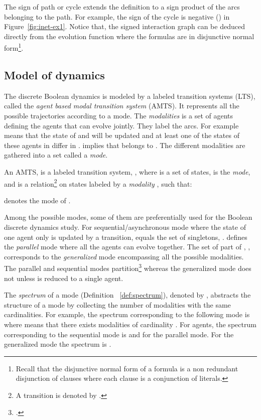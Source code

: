 \documentclass[12pt]{elsarticle}
\begin{document}
The sign of path or cycle extends the definition to a sign product of the arcs belonging to the path. For example, the sign of the cycle  is negative () in Figure~\ref{fig:inet-ex1}. Notice that, the signed interaction graph can be deduced directly from the evolution function where the formulas are in disjunctive normal form\footnote{Recall that the disjunctive normal form of a formula is a non redundant disjunction of clauses where each clause is a conjunction of literals.}. 



\subsection{Model of dynamics}
The discrete Boolean dynamics is modeled by a labeled transition systems (LTS), called the \emph{agent based modal transition system} (AMTS). It represents all the possible trajectories according to a mode. The \emph{modalities} is a set of agents defining the agents that can evolve jointly. They label the arcs. For example  means that the state of  and  will be updated and at least one of the states of these agents in  differ in .  implies that  belongs to . The different modalities are gathered into a set called a \emph{mode}. 
\begin{definition}
\label{def:amts}
An AMTS, is a labeled transition system, , where  is a set of states,  is the \emph{mode}, and  is a relation\footnote{A transition  is denoted by .} on states labeled by a \emph{modality} , such that: 
 

\noindent
 denotes the mode of .
\end{definition}
Among the possible modes, some of them are preferentially used for the Boolean discrete dynamics study. For sequential/asynchronous mode where the state of one agent only is updated by a transition,  equals the set of singletons, .  defines the \emph{parallel} mode where all the agents can evolve together. The set of part of , , corresponds to the \emph{generalized} mode encompassing all the possible modalities. The parallel and sequential modes partition\footnote{ .}  whereas the generalized mode does not unless  is reduced to a single agent. 

The \emph{spectrum} of a mode (Definition~ \ref{def:spectrum}), denoted by , abstracts the structure of a mode by collecting the number of modalities with the same cardinalities. For example, the spectrum corresponding to the following mode  is  where  means that there exists  modalities of cardinality . For  agents, the spectrum corresponding to the sequential mode is  and  for the parallel mode. 
For the generalized mode the spectrum is . 
\end{document}
